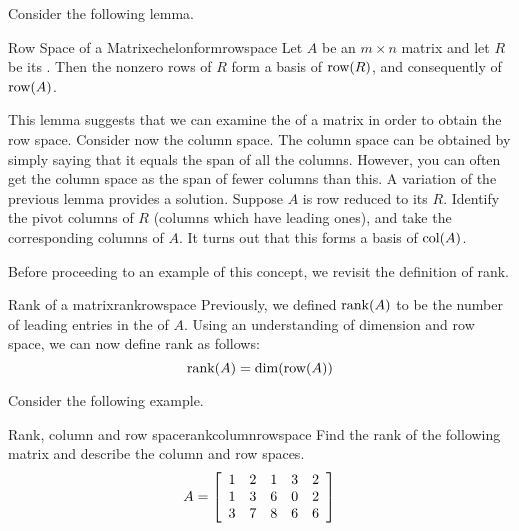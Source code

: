 Consider the following lemma. 

\begin{lemma}{Row Space of a {\EF} Matrix}{echelonformrowspace}
Let $A$ be an $m \times n$ matrix and let $R$ be its {\ef}. Then the nonzero rows of $R$ form a basis of $\mbox{row}(R)$, and consequently of $\mbox{row}(A)$. 
\end{lemma}

This lemma suggests that we can examine the {\ef} of a matrix in order to obtain the row space. Consider now the column space. The column space can be obtained by simply saying that
it equals the span of all the columns. However, you can often get the column
space as the span of fewer columns than this. A variation of the previous lemma provides a solution. Suppose $A$ is row reduced to its {\ef} $R$. Identify the pivot columns of $R$ (columns which have leading ones), and take the corresponding columns of $A$. It turns out that this forms a basis of $\mbox{col}(A)$. 

Before proceeding to an example of this concept, we revisit the definition of rank. 

\begin{definition}{Rank of a matrix}{rankrowspace}
Previously, we defined $\mbox{rank}(A)$ to be the number of leading entries in the {\ef} of $A$. Using an understanding of dimension and row space, we can now define rank as follows:
\[
\mbox{rank}(A) = \dim(\mbox{row}(A))
\]
\end{definition}

Consider the following example. 

\begin{example}{Rank, column and row space}{rankcolumnrowspace}
Find the rank of the following matrix and describe the column and row spaces.
\begin{equation*}
A = 
\left[
\begin{array}{rrrrr}
1 & 2 & 1 & 3 & 2 \\
1 & 3 & 6 & 0 & 2 \\
3 & 7 & 8 & 6 & 6
\end{array}
\right]  
\end{equation*}
\end{example}

